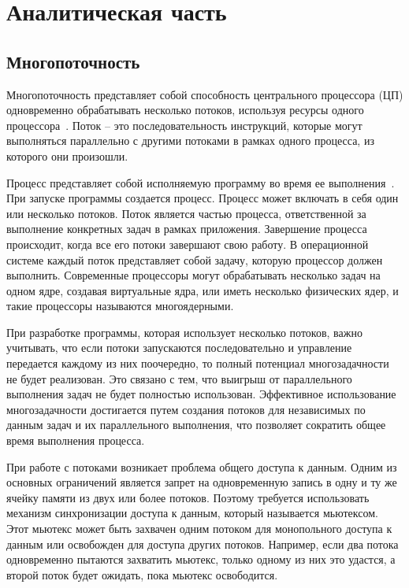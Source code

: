 \chapter{Аналитическая часть}
\section{Многопоточность}

Многопоточность представляет собой способность центрального процессора (ЦП) одновременно обрабатывать несколько потоков, используя ресурсы одного процессора~\cite{multithreading}. 
Поток -- это последовательность инструкций, которые могут выполняться параллельно с другими потоками в рамках одного процесса, из которого они произошли.

Процесс представляет собой исполняемую программу во время ее выполнения~\cite{process}. При запуске программы создается процесс.
Процесс может включать в себя один или несколько потоков. 
Поток является частью процесса, ответственной за выполнение конкретных задач в рамках приложения. 
Завершение процесса происходит, когда все его потоки завершают свою работу. В операционной системе каждый поток представляет собой задачу, которую процессор должен выполнить. 
Современные процессоры могут обрабатывать несколько задач на одном ядре, создавая виртуальные ядра, или иметь несколько физических ядер, и такие процессоры называются многоядерными.

При разработке программы, которая использует несколько потоков, важно учитывать, что если потоки запускаются последовательно и управление передается каждому из них поочередно, то полный потенциал многозадачности не будет реализован. 
Это связано с тем, что выигрыш от параллельного выполнения задач не будет полностью использован. 
Эффективное использование многозадачности достигается путем создания потоков для независимых по данным задач и их параллельного выполнения, что позволяет сократить общее время выполнения процесса.

При работе с потоками возникает проблема общего доступа к данным. 
Одним из основных ограничений является запрет на одновременную запись в одну и ту же ячейку памяти из двух или более потоков.
Поэтому требуется использовать механизм синхронизации доступа к данным, который называется мьютексом. 
Этот мьютекс может быть захвачен одним потоком для монопольного доступа к данным или освобожден для доступа других потоков. Например, если два потока одновременно пытаются захватить мьютекс, только одному из них это удастся, а второй поток будет ожидать, пока мьютекс освободится.

